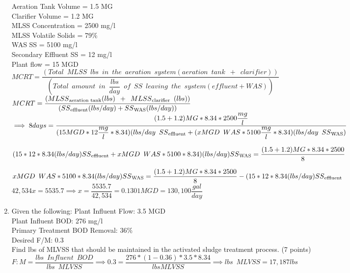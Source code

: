 \begin{enumerate}
Aeration Tank Volume = 1.5 MG\\
Clarifier Volume = 1.2 MG\\
MLSS Concentration = 2500 mg/l\\
MLSS Volatile Solids = 79\%\\
WAS SS = 5100 mg/l\\
Secondary Effluent SS = 12 mg/l\\
Plant flow = 15 MGD\\
$ MCRT = \dfrac{(Total \enspace MLSS \enspace lbs \enspace in \enspace the \enspace aeration \enspace system (aeration \enspace tank\enspace+\enspace clarifier))}{(Total \enspace amount \enspace in \enspace \dfrac{lbs}{day} \enspace of \enspace  SS \enspace leaving \enspace the  \enspace system (effluent+WAS))}$\\
$MCRT =\dfrac{(MLSS\textsubscript{aeration tank} (lbs)\enspace + \enspace MLSS \textsubscript{clarifier} \enspace (lbs))}{(SS \textsubscript{effluent} (lbs/day)+SS \textsubscript{WAS} (lbs/day))}$\\

$\implies 8 days=\dfrac{(1.5 + 1.2)MG * 8.34 * 2500 \dfrac{mg}{l}}{(15 MGD*12\dfrac{mg}{l} *8.34) (lbs/day \enspace SS \textsubscript{effluent}+(xMGD \enspace WAS * 5100\dfrac{mg}{l}*8.34)(lbs/day \enspace SS \textsubscript{WAS})}$

$(15 *12*8.34 (lbs/day)SS \textsubscript{effluent}+xMGD\enspace WAS * 5100*8.34)(lbs/day)SS \textsubscript{WAS}=\dfrac{(1.5 + 1.2)MG * 8.34 * 2500}{8}$

$xMGD\enspace WAS * 5100*8.34(lbs/day)SS \textsubscript{WAS}=\dfrac{(1.5 + 1.2)MG * 8.34 * 2500}{8}-(15 *12*8.34 (lbs/day)SS \textsubscript{effluent}$\\
$42,534x=5535.7\implies x =\dfrac{5535.7}{42,534}=0.1301 MGD = \boxed{130,100\dfrac{gal}{day}}$\\
\vspace {8mm}

\item Given the following:
Plant Influent Flow:  3.5 MGD\\
Plant Influent BOD:  276 mg/l\\
Primary Treatment BOD Removal:  36\%\\
Desired F/M:  0.3\\
Find lbs of MLVSS that should be maintained in the activated sludge treatment process. (7 points)
$F:M = \dfrac{lbs \enspace Influent \enspace BOD}{lbs \enspace MLVSS}\implies 0.3 = \dfrac{276*(1-0.36)*3.5*8.34}{lbs MLVSS} \implies lbs \enspace MLVSS=\boxed{17,187lbs}$


\end{enumerate}
